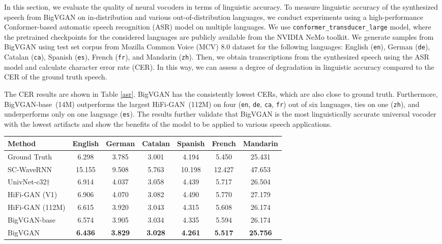 \documentclass{article} \usepackage{iclr2023_conference,times}
\theoremstyle{plain}
\theoremstyle{definition}
\theoremstyle{remark}
\begin{document}
In this section, we evaluate the quality of neural vocoders in terms of linguistic accuracy. To measure linguistic accuracy of the synthesized speech from BigVGAN on in-distribution and various out-of-distribution languages, we conduct experiments using a high-performance Conformer-based \citep{gulati2020conformer} automatic speech recognition (ASR) model on multiple languages. We use \texttt{conformer\_transducer\_large} model, where the pretrained checkpoints for the considered languages are publicly available from the NVIDIA NeMo \citep{kuchaiev2019nemo} toolkit. We generate samples from BigVGAN using test set corpus from Mozilla Common Voice (MCV) 8.0 dataset for the following languages: English (\texttt{en}), German (\texttt{de}), Catalan (\texttt{ca}), Spanish (\texttt{es}), French (\texttt{fr}), and Mandarin (\texttt{zh}). Then, we obtain transcriptions from the synthesized speech using the ASR model and calculate character error rate (CER). In this way, we can assess a degree of degradation in linguistic accuracy compared to the CER of the ground truth speech.

The CER results are shown in Table \ref{asr}. BigVGAN has the consistently lowest CERs, which are also close to ground truth. Furthermore, BigVGAN-base~(14M) outperforms the largest HiFi-GAN~(112M) on four (\texttt{en}, \texttt{de}, \texttt{ca}, \texttt{fr}) out of six languages, ties on one (\texttt{zh}), and underperforms only on one language (\texttt{es}). The results further validate that BigVGAN is the most linguistically accurate universal vocoder with the lowest artifacts and show the benefits of the model to be applied to various speech applications. 


\begin{table*}[t]
\caption{\footnotesize
Character error rates (CER) of synthesized speech on multiple languages.
}
\label{asr}
\vspace{-0.05cm}
\begin{center}
\begin{small}
\begin{tabular}{l|cccccc}
\toprule
Method & English & German & Catalan & Spanish & French & Mandarin \\
\midrule
Ground Truth & 6.298 & 3.785 & 3.001 & 4.194 & 5.450 & 25.431 \\
\midrule 
SC-WaveRNN & 15.155 & 9.508 & 5.763 & 10.198 & 12.427 & 47.653 \\
UnivNet-c32$\dagger$ & 6.914 & 4.037 & 3.058 & 4.439 & 5.717 & 26.504 \\
HiFi-GAN (V1) & 6.906 & 4.070 & 3.082 & 4.490 & 5.770 & 27.179 \\
HiFi-GAN (112M) & 6.615 & 3.920 & 3.043 & 4.315 & 5.608 & 26.174 \\
\midrule
BigVGAN-base  & 6.574 & 3.905 & 3.034 & 4.335 & 5.594 & 26.174 \\
BigVGAN  & \textbf{6.436} & \textbf{3.829} & \textbf{3.028} & \textbf{4.261} & \textbf{5.517} & \textbf{25.756} \\

\bottomrule
\end{tabular}
\end{small}
\end{center}
\vskip -0.1in
\end{table*}
\end{document}
